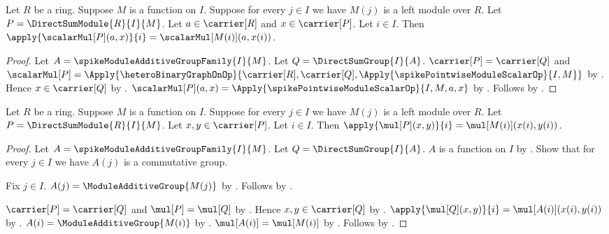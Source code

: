 \begin{proposition}\label{spike_direct_sum_module_scalar_coordinate}
    Let $R$ be a ring.
    Suppose $M$ is a function on $I$.
    Suppose for every $j\in I$ we have $M(j)$ is a left module over $R$.
    Let $P=\DirectSumModule{R}{I}{M}$.
    Let $a\in\carrier[R]$ and $x\in\carrier[P]$.
    Let $i\in I$.
    Then
        $\apply{\scalarMul[P](a,x)}{i}
            =\scalarMul[M(i)](a,x(i))$.
\end{proposition}
\begin{proof}
    Let $A=\spikeModuleAdditiveGroupFamily{I}{M}$.
    Let $Q=\DirectSumGroup{I}{A}$.
    $\carrier[P]=\carrier[Q]$ and
        $\scalarMul[P]=\Apply{\heteroBinaryGraphOnOp}{
            \carrier[R],\carrier[Q],
            \Apply{\spikePointwiseModuleScalarOp}{I,M}}$ by
        .
    Hence $x\in\carrier[Q]$ by \auto.
    $\scalarMul[P](a,x)
        =\Apply{\spikePointwiseModuleScalarOp}{I,M,a,x}$ by
        .
    Follows by
        .
\end{proof}

\begin{proposition}\label{spike_direct_sum_module_add_coordinate}
    Let $R$ be a ring.
    Suppose $M$ is a function on $I$.
    Suppose for every $j\in I$ we have $M(j)$ is a left module over $R$.
    Let $P=\DirectSumModule{R}{I}{M}$.
    Let $x,y\in\carrier[P]$.
    Let $i\in I$.
    Then
        $\apply{\mul[P](x,y)}{i}=\mul[M(i)](x(i),y(i))$.
\end{proposition}
\begin{proof}
    Let $A=\spikeModuleAdditiveGroupFamily{I}{M}$.
    Let $Q=\DirectSumGroup{I}{A}$.
    $A$ is a function on $I$ by
        .
    Show that for every $j\in I$ we have
        $A(j)$ is a commutative group.
    \begin{subproof}
        Fix $j\in I$.
        $A(j)=\ModuleAdditiveGroup{M(j)}$ by
            .
        Follows by .
    \end{subproof}
    $\carrier[P]=\carrier[Q]$ and $\mul[P]=\mul[Q]$ by
        .
    Hence $x,y\in\carrier[Q]$ by \auto.
    $\apply{\mul[Q](x,y)}{i}=\mul[A(i)](x(i),y(i))$ by
        .
    $A(i)=\ModuleAdditiveGroup{M(i)}$ by
        .
    $\mul[A(i)]=\mul[M(i)]$ by
        .
    Follows by \auto.
\end{proof}

